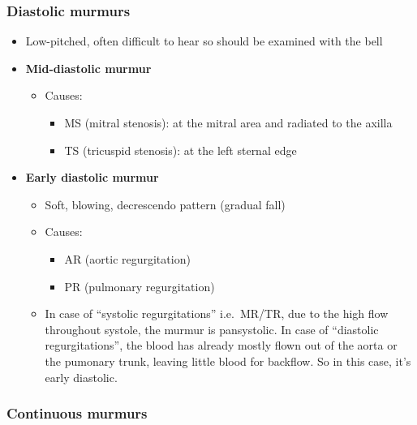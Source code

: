 \documentclass[
  12pt,
]{memoir}
\providecommand{\tightlist}{%
  \setlength{\itemsep}{0pt}\setlength{\parskip}{0pt}}
\begin{document}
\hypertarget{diastolic-murmurs}{%
\subsubsection{Diastolic murmurs}\label{diastolic-murmurs}}

\begin{itemize}
\tightlist
\item
  Low-pitched, often difficult to hear so should be examined with the
  bell
\item
  \textbf{Mid-diastolic murmur}

  \begin{itemize}
  \tightlist
  \item
    Causes:

    \begin{itemize}
    \tightlist
    \item
      MS (mitral stenosis): at the mitral area and radiated to the
      axilla
    \item
      TS (tricuspid stenosis): at the left sternal edge
    \end{itemize}
  \end{itemize}
\item
  \textbf{Early diastolic murmur}

  \begin{itemize}
  \tightlist
  \item
    Soft, blowing, decrescendo pattern (gradual fall)
  \item
    Causes:

    \begin{itemize}
    \tightlist
    \item
      AR (aortic regurgitation)
    \item
      PR (pulmonary regurgitation)
    \end{itemize}
  \item
    In case of ``systolic regurgitations'' i.e.~MR/TR, due to the high
    flow throughout systole, the murmur is pansystolic. In case of
    ``diastolic regurgitations'', the blood has already mostly flown out
    of the aorta or the pumonary trunk, leaving little blood for
    backflow. So in this case, it's early diastolic.
  \end{itemize}
\end{itemize}

\hypertarget{continuous-murmurs}{%
\subsubsection{Continuous murmurs}\label{continuous-murmurs}}
\end{document}
